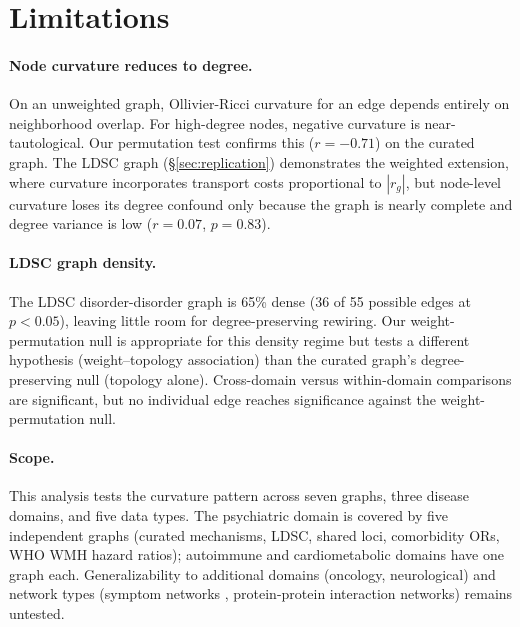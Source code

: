 \documentclass[11pt]{article}
\begin{document}
\section{Limitations}
\label{sec:limitations}

\paragraph{Node curvature reduces to degree.} On an unweighted graph, Ollivier-Ricci curvature for an edge depends entirely on neighborhood overlap. For high-degree nodes, negative curvature is near-tautological. Our permutation test confirms this ($r = -0.71$) on the curated graph. The LDSC graph (\S\ref{sec:replication}) demonstrates the weighted extension, where curvature incorporates transport costs proportional to $|r_g|$, but node-level curvature loses its degree confound only because the graph is nearly complete and degree variance is low ($r = 0.07$, $p = 0.83$).

\paragraph{LDSC graph density.} The LDSC disorder-disorder graph is 65\% dense (36 of 55 possible edges at $p < 0.05$), leaving little room for degree-preserving rewiring. Our weight-permutation null is appropriate for this density regime but tests a different hypothesis (weight--topology association) than the curated graph's degree-preserving null (topology alone). Cross-domain versus within-domain comparisons are significant, but no individual edge reaches significance against the weight-permutation null.

\paragraph{Scope.} This analysis tests the curvature pattern across seven graphs, three disease domains, and five data types. The psychiatric domain is covered by five independent graphs (curated mechanisms, LDSC, shared loci, comorbidity ORs, WHO WMH hazard ratios); autoimmune and cardiometabolic domains have one graph each. Generalizability to additional domains (oncology, neurological) and network types (symptom networks \citep{borsboom2021network}, protein-protein interaction networks) remains untested.
\end{document}
